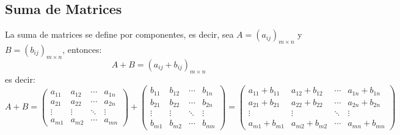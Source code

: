 \subsection{Suma de Matrices}
La suma de matrices se define por componentes, es decir, sea $A = (a_{ij})_{m\times n}$ y $B=(b_{ij})_{m\times n}$, entonces:
\begin{equation}
	A + B = (a_{ij}+ b_{ij})_{m \times n}
\end{equation}
es decir:
\begin{equation*}
		A +	B= \left(  \begin{matrix}
		a_{11} & a_{12} &\cdots   &  a_{1n}\\
		a_{21}& a_{22} & \cdots  & a_{2n} \\
		\vdots &\vdots   &  \ddots & \vdots  \\
		a_{m1} & a_{m2} & \cdots  & a_{mn}
	\end{matrix}\right) +  \left(  \begin{matrix}
	b_{11} & b_{12} &\cdots   &  b_{1n}\\
	b_{21}& b_{22} & \cdots  & b_{2n} \\
	\vdots &\vdots   &  \ddots & \vdots  \\
	b_{m1} & b_{m2} & \cdots  & b_{mn}
	\end{matrix}\right) = \left(  \begin{matrix}
	a_{11}+b_{11} & a_{12}+b_{12} &\cdots   &  a_{1n}+b_{1n}\\
	a_{21}+b_{21}& a_{22}+b_{22} & \cdots  & a_{2n}+b_{2n} \\
	\vdots &\vdots   &  \ddots & \vdots  \\
	a_{m1}+b_{m1} & a_{m2}+b_{m2} & \cdots  & a_{mn}+b_{mn}
	\end{matrix}\right)
\end{equation*}

